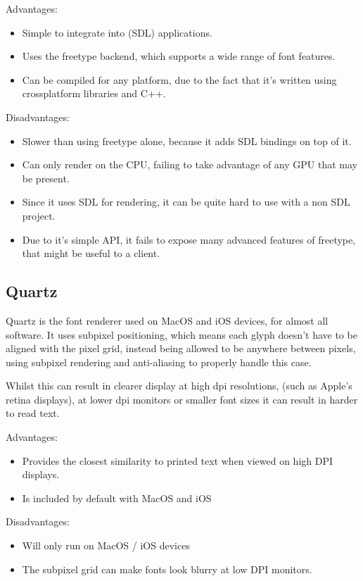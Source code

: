 \documentclass{report}
\begin{document}
Advantages:
\begin{itemize}
\item{Simple to integrate into (SDL) applications.}
\item{Uses the freetype backend, which supports a wide range of font features.}
\item{Can be compiled for any platform, due to the fact that it's written
    using crossplatform libraries and C++.}    
\end{itemize}

Disadvantages:
\begin{itemize}
\item{Slower than using freetype alone, because it adds SDL bindings on top of
    it.}
\item{Can only render on the CPU, failing to take advantage of any GPU that may
    be present.}
\item{Since it uses SDL for rendering, it can be quite hard to use with a non
    SDL project.}
\item{Due to it's simple API, it fails to expose many advanced features of
    freetype, that might be useful to a client.}
\end{itemize}

\subsection{Quartz}
Quartz is the font renderer used on MacOS and iOS devices, for almost all
software. It uses subpixel positioning, which means each glyph doesn't have to
be aligned with the pixel grid, instead being allowed to be anywhere between
pixels, using subpixel rendering and anti-aliasing to properly handle this
case.

Whilst this can result in clearer display at high dpi resolutions, (such as
Apple's retina displays), at lower dpi monitors or smaller font sizes it can
result in harder to read text.

Advantages:
\begin{itemize}
  \item{Provides the closest similarity to printed text when viewed on high DPI
      displays. }
  \item{Is included by default with MacOS and iOS}
\end{itemize}

Disadvantages:
\begin{itemize}
\item{Will only run on MacOS / iOS devices}
\item{The subpixel grid can make fonts look blurry at low DPI monitors.}
\end{itemize}
\end{document}
